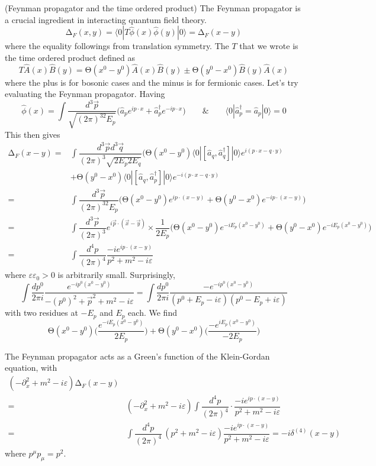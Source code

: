 \begin{defi}
(Feynman propagator and the time ordered product) The Feynman propagator is a crucial ingredient in interacting quantum field theory.
\[\mathrm{\Delta }_{F}(x,y)=\langle 0|T\hat{\phi }(x)\hat{\phi }(y)|0\rangle =\mathrm{\Delta }_{F}(x-y)\]
where the equality followings from translation symmetry. The $T$ that we wrote is the time ordered product defined as
\[T\hat{A}(x)\hat{B}(y)=\mathrm{\Theta}(x^{0}-y^{0})\hat{A}(x)\hat{B}(y)\pm \mathrm{\Theta}(y^{0}-x^{0})\hat{B}(y)\hat{A}(x)\]
where the plus is for bosonic cases and the minus is for fermionic cases. Let's try evaluating the Feynman propagator. Having
\[\hat{\phi }(x)=\int \dfrac{d^3\vec{p}}{\sqrt{(2\pi )^32E_{p}}}\Big(\hat{a}_{p}e^{ip\cdot x}+\hat{a}_{p}^{\dagger}e^{-ip\cdot x}\Big)\qquad\&\qquad \langle 0|\hat{a}_{p}^{\dagger}=\hat{a}_{p}|0\rangle =0\]
This then gives
\[\begin{align*}
\mathrm{\Delta }_{F}(x-y)=&\int \dfrac{d^3\vec{p}d^3\vec{q}}{(2\pi )^3\sqrt{2E_{p}2E_{q}}}\bigg(\mathrm{\Theta}(x^{0}-y^{0})\langle 0|[\hat{a}_{q},\hat{a}_{q}^{\dagger}]|0\rangle e^{i(p\cdot x-q\cdot y)}\\
&+\mathrm{\Theta}(y^{0}-x^{0})\langle 0|[\hat{a}_{q},\hat{a}_{p}^{\dagger}]|0\rangle e^{-i(p\cdot x-q\cdot y)}
\\
=&\int \dfrac{d^3\vec{p}}{(2\pi )^32E_{p}}\Big(\mathrm{\Theta}(x^{0}-y^{0})e^{ip\cdot (x-y)}+\mathrm{\Theta}(y^{0}-x^{0})e^{-ip\cdot (x-y)}\Big)\\
=&\int \dfrac{d^3\vec{p}}{(2\pi )^3}e^{i\vec{p}\cdot (\vec{x}-\vec{y})}\times \dfrac{1}{2E_{p}}\Big(\mathrm{\Theta}(x^{0}-y^{0})e^{-iE_{p}(x^{0}-y^{0})}+\mathrm{\Theta}(y^{0}-x^{0})e^{-iE_{p}(x^{0}-y^{0})}\Big)\\
=&\int \dfrac{d^{4}p}{(2\pi )^{4}}\dfrac{-ie^{ip\cdot (x-y)}}{p^2+m^2-i\varepsilon }
\end{align*}\]
where $\varepsilon \varepsilon_0>0$ is arbitrarily small. Surprisingly,
\[\int \dfrac{dp^{0}}{2\pi i}\dfrac{e^{-ip^{0}(x^{0}-y^{0})}}{-(p^{0})^2+\vec{p}^2+m^2-i\varepsilon }=\int \dfrac{dp^{0}}{2\pi i}\dfrac{-e^{-ip^{0}(x^{0}-y^{0})}}{(p^{0}+E_p-i\varepsilon )(p^{0}-E_{p}+i\varepsilon )}\]
with two residues at $-E_{p}$ and $E_{p}$ each. We find
\[\mathrm{\Theta}(x^{0}-y^{0})\Big(\dfrac{e^{-iE_{p}(x^{0}-y^{0})}}{2E_{p}}\Big)+\mathrm{\Theta}(y^{0}-x^{0})\Big(\dfrac{-e^{iE_{p}(x^{0}-y^{0})}}{-2E_{p}}\Big)\]
\end{defi}
\vspace{2ex}
\begin{prop}
The Feynman propagator acts as a Green's function of the Klein-Gordan equation, with
\[\begin{align*}
(-\partial _{x}^2+m^2-i\varepsilon )\mathrm{\Delta }_{F}(x-y)\\
=&(-\partial _{x}^2+m^2-i\varepsilon )\int \dfrac{d^{4}p}{(2\pi )^{4}}\cdot \dfrac{-ie^{ip\cdot (x-y)}}{p^2+m^2-i\varepsilon }\\
=&\int \dfrac{d^{4}p}{(2\pi )^{4}}\,(p^2+m^2-i\varepsilon )\dfrac{-ie^{ip\cdot (x-y)}}{p^2+m^2-i\varepsilon }=-i\delta ^{(4)}(x-y)
\end{align*}\]
where $p^{\mu }p_{\mu }=p^2$.
\end{prop}
\vspace{2ex}

